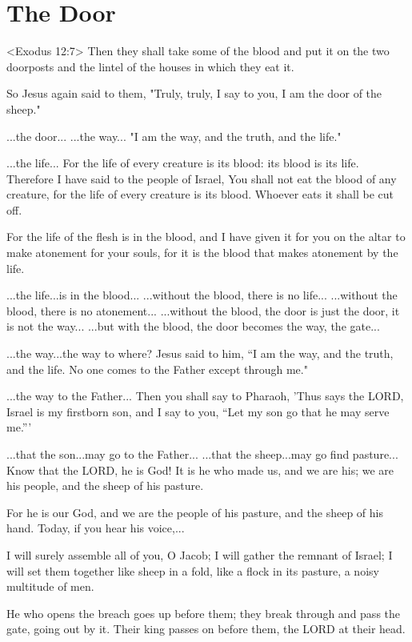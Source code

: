 \documentclass[10pt,oneside,footinclude=true,headinclude=true]{scrbook} %
\begin{document}
\chapter{The Door}
<Exodus 12:7>
Then they shall take some of the blood and put it on the two doorposts and the lintel of the houses in which they eat it.

So Jesus again said to them, "Truly, truly, I say to you, I am the door of the sheep."

...the door...
...the way...
"I am the way, and the truth, and the life."

...the life...
For the life of every creature is its blood: its blood is its life. Therefore I have said to the people of Israel, You shall not eat the blood of any creature, for the life of every creature is its blood. Whoever eats it shall be cut off.

For the life of the flesh is in the blood, and I have given it for you on the altar to make atonement for your souls, for it is the blood that makes atonement by the life.

...the life...is in the blood...
...without the blood, there is no life...
...without the blood, there is no atonement...
...without the blood, the door is just the door, it is not the way...
...but with the blood, the door becomes the way, the gate...

...the way...the way to where?
Jesus said to him, “I am the way, and the truth, and the life. No one comes to the Father except through me."

...the way to the Father...
Then you shall say to Pharaoh, 'Thus says the LORD, Israel is my firstborn son,  and I say to you, “Let my son go that he may serve me.”'

...that the son...may go to the Father...
...that the sheep...may go find pasture...
Know that the LORD, he is God!
    It is he who made us, and we are his;
    we are his people, and the sheep of his pasture.

For he is our God,
    and we are the people of his pasture,
    and the sheep of his hand.
Today, if you hear his voice,...

I will surely assemble all of you, O Jacob;
    I will gather the remnant of Israel;
I will set them together
    like sheep in a fold,
like a flock in its pasture,
    a noisy multitude of men.

He who opens the breach goes up before them;
    they break through and pass the gate,
    going out by it.
Their king passes on before them,
    the LORD at their head.
\end{document}
